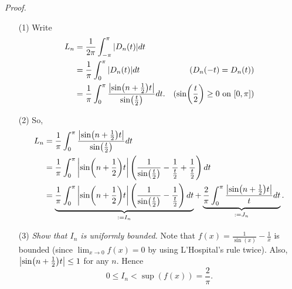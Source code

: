 \documentclass{article}
\begin{document}
\emph{Proof.}
\begin{enumerate}
\item[(1)]
Write
\begin{align*}
  L_n
  &= \frac{1}{2\pi} \int_{-\pi}^{\pi} \abs{ D_n(t) } dt \\
  &= \frac{1}{\pi} \int_{0}^{\pi} \abs{ D_n(t) } dt
    &(D_n(-t) = D_n(t)) \\
  &= \frac{1}{\pi} \int_{0}^{\pi} \frac{\abs{ \sin(n+\frac{1}{2})t }}{\sin(\frac{t}{2})} dt.
    &\text{($\sin(\frac{t}{2}) \geq 0$ on $[0,\pi]$)}
\end{align*}

\item[(2)]
So,
\begin{align*}
  L_n
  &= \frac{1}{\pi} \int_{0}^{\pi} \frac{\abs{ \sin(n+\frac{1}{2})t }}{\sin(\frac{t}{2})} dt \\
  &= \frac{1}{\pi} \int_{0}^{\pi} \abs{ \sin(n+\frac{1}{2})t }
    \left( \frac{1}{\sin(\frac{t}{2})} - \frac{1}{\frac{t}{2}} + \frac{1}{\frac{t}{2}} \right) dt \\
  &= \underbrace{
      \frac{1}{\pi} \int_{0}^{\pi} \abs{ \sin(n+\frac{1}{2})t }
      \left( \frac{1}{\sin(\frac{t}{2})} - \frac{1}{\frac{t}{2}} \right) dt }_{:= I_n}
    + \underbrace{
      \frac{2}{\pi} \int_{0}^{\pi} \frac{\abs{ \sin(n+\frac{1}{2})t }}{t} dt }_{:= J_n}.
\end{align*}

\item[(3)]
\emph{Show that $I_n$ is uniformly bounded.}
Note that $f(x) = \frac{1}{\sin(x)} - \frac{1}{x}$ is bounded
(since $\lim_{x \to 0} f(x) = 0$ by using L'Hospital's rule twice).
Also, $\abs{ \sin(n+\frac{1}{2})t } \leq 1$ for any $n$.
Hence
\[
  0 \leq I_n < \sup(f(x)) = \frac{2}{\pi}.
\]


\end{enumerate}
\end{document}
